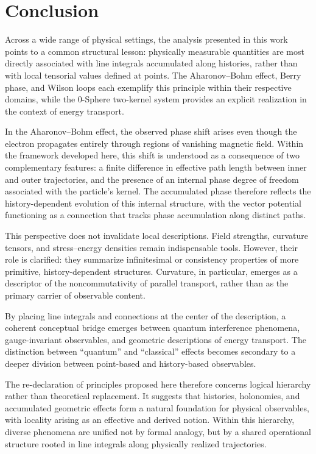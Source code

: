 \documentclass[%
 reprint,
 amsmath,amssymb,
 aps,
 prb,
]{revtex4-2}
\numberwithin{equation}{section}
\begin{document}
\section{Conclusion}
\label{sec:conclusion}

Across a wide range of physical settings, the analysis presented in this work points to a common structural lesson: physically measurable quantities are most directly associated with line integrals accumulated along histories, rather than with local tensorial values defined at points. The Aharonov--Bohm effect, Berry phase, and Wilson loops each exemplify this principle within their respective domains, while the 0-Sphere two-kernel system provides an explicit realization in the context of energy transport.

In the Aharonov--Bohm effect, the observed phase shift arises even though the electron propagates entirely through regions of vanishing magnetic field. Within the framework developed here, this shift is understood as a consequence of two complementary features: a finite difference in effective path length between inner and outer trajectories, and the presence of an internal phase degree of freedom associated with the particle’s kernel. The accumulated phase therefore reflects the history-dependent evolution of this internal structure, with the vector potential functioning as a connection that tracks phase accumulation along distinct paths.

This perspective does not invalidate local descriptions. Field strengths, curvature tensors, and stress--energy densities remain indispensable tools. However, their role is clarified: they summarize infinitesimal or consistency properties of more primitive, history-dependent structures. Curvature, in particular, emerges as a descriptor of the noncommutativity of parallel transport, rather than as the primary carrier of observable content.

By placing line integrals and connections at the center of the description, a coherent conceptual bridge emerges between quantum interference phenomena, gauge-invariant observables, and geometric descriptions of energy transport. The distinction between ``quantum'' and ``classical'' effects becomes secondary to a deeper division between point-based and history-based observables.

The re-declaration of principles proposed here therefore concerns logical hierarchy rather than theoretical replacement. It suggests that histories, holonomies, and accumulated geometric effects form a natural foundation for physical observables, with locality arising as an effective and derived notion. Within this hierarchy, diverse phenomena are unified not by formal analogy, but by a shared operational structure rooted in line integrals along physically realized trajectories.
\end{document}

